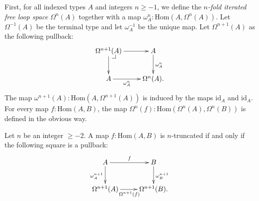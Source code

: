 \documentclass[reqno]{amsart}
\makeatletter
\theoremstyle{definition}
\theoremstyle{remark}
\newcommand{\fs}[1]{\mathrm{#1}}
\newcommand{\Hom}{\fs{Hom}}
\newcommand{\id}{\fs{id}}
\numberwithin{figure}{section}
\newcommand{\pb}[1][dr]{\save*!/#1-1.2pc/#1:(-1,1)@^{|-}\restore}
\makeatother
\begin{document}
First, for all indexed types $A$ and integers $n \geq -1$, we define the \emph{$n$-fold iterated free loop space} $\Omega^n(A)$ together with a map $\omega^n_A : \Hom(A,\Omega^n(A))$.
Let $\Omega^{-1}(A)$ be the terminal type and let $\omega^{-1}_A$ be the unique map.
Let $\Omega^{n+1}(A)$ as the following pullback:
\[ \xymatrix{ \Omega^{n+1}(A) \ar[r] \ar[d] \pb & A \ar[d]^{\omega^n_A} \\
              A \ar[r]_-{\omega^n_A}            & \Omega^n(A).
            } \]
The map $\omega^{n+1}(A) : \Hom(A,\Omega^{n+1}(A))$ is induced by the maps $\id_A$ and $\id_A$.
For every map $f : \Hom(A,B)$, the map $\Omega^n(f) : \Hom(\Omega^n(A),\Omega^n(B))$ is defined in the obvious way.

\begin{prop}[mono]
Let $n$ be an integer $\geq -2$.
A map $f : \Hom(A,B)$ is $n$-truncated if and only if the following square is a pullback:
\[ \xymatrix{ A \ar[r]^f \ar[d]_{\omega^{n+1}_A} & B \ar[d]^{\omega^{n+1}_B} \\
              \Omega^{n+1}(A) \ar[r]_{\Omega^{n+1}(f)} & \Omega^{n+1}(B).
            } \]
\end{prop}
\end{document}
